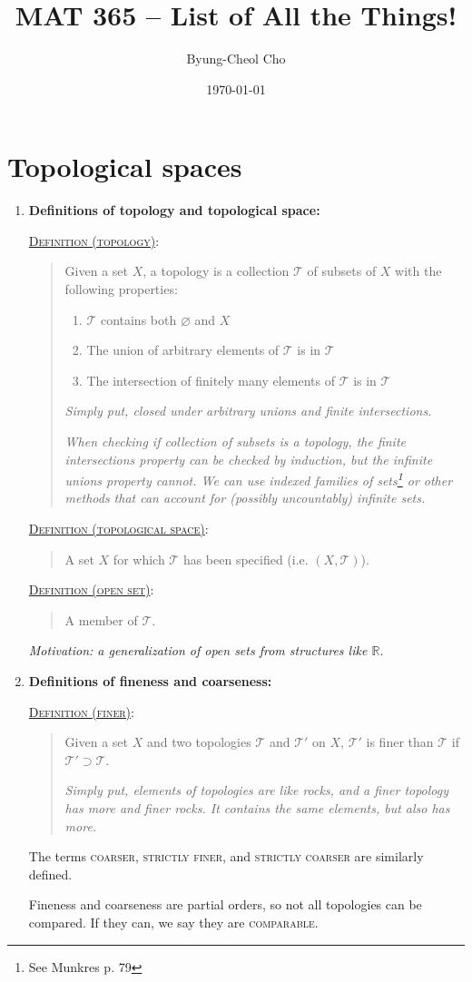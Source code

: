\documentclass[letterpaper, 12pt]{article}
\title{MAT 365 -- List of All the Things!}
\author{Byung-Cheol Cho}
\date{\today}
\newcommand{\RR}{\mathbb{R}}
\newcommand{\ms}[1]{\mathscr{#1}}
\newcommand{\defn}[2]{\textsc{\underline{Definition (#1)}:}\begin{quote} #2\end{quote}}
\let\emptyset\varnothing
\begin{document}
\maketitle

\section{Topological spaces}
    \begin{enumerate}
    \item \textbf{Definitions of topology and topological space:}

    \defn{topology}{Given a set $X$, a topology is a collection $\ms{T}$ of subsets of $X$ with the following properties:
    \begin{enumerate}
    \item $\ms{T}$ contains both $\emptyset$ and $X$
    \item The union of arbitrary elements of $\ms{T}$ is in $\ms{T}$
    \item The intersection of finitely many elements of $\ms{T}$ is in $\ms{T}$
    \end{enumerate}
    \textit{Simply put, closed under arbitrary unions and finite intersections.}

    \textit{When checking if collection of subsets is a topology, the finite intersections property can be checked by induction, but the infinite unions property cannot. We can use indexed families of sets\footnote{See Munkres p. 79} or other methods that can account for (possibly uncountably) infinite sets.}
    }
    \defn{topological space}{A set $X$ for which $\ms{T}$ has been specified (i.e. $(X, \ms{T})$).}
    \defn{open set}{A member of $\ms{T}$.}
    \textit{Motivation: a generalization of open sets from structures like $\RR$.}
    \item \textbf{Definitions of fineness and coarseness:}

    \defn{finer}{Given a set $X$ and two topologies $\ms{T}$ and $\ms{T'}$ on $X$, $\ms{T'}$ is finer than $\ms{T}$ if $\ms{T'}\supset\ms{T}$.\par\textit{Simply put, elements of topologies are like rocks, and a finer topology has more and finer rocks. It contains the same elements, but also has more.}}
    The terms \textsc{coarser}, \textsc{strictly finer}, and \textsc{strictly coarser} are similarly defined.

    Fineness and coarseness are partial orders, so not all topologies can be compared. If they can, we say they are \textsc{comparable}.
    \end{enumerate}
\end{document}
